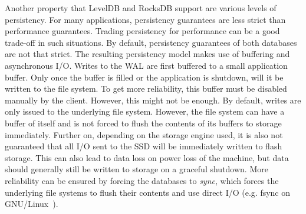 Another property that LevelDB and RocksDB support are various levels of persistency. For many applications, persistency guarantees are less strict than performance guarantees. Trading persistency for performance can be a good trade-off in such situations. By default, persistency guarantees of both databases are not that strict.  The resulting persistency model makes use of buffering and asynchronous I/O. Writes to the WAL are first buffered to a small application buffer. Only once the buffer is filled or the application is shutdown, will it be written to the file system. To get more reliability, this buffer must be disabled manually by the client. However, this might not be enough. By default, writes are only issued to the underlying file system. However, the file system can have a buffer of itself and is not forced to flush the contents of its buffers to storage immediately. Further on, depending on the storage engine used, it is also not guaranteed that all I/O sent to the SSD will be immediately written to flash storage. This can also lead to data loss on power loss of the machine, but data should generally still be written to storage on a graceful shutdown. More reliability can be ensured by forcing the databases to \textit{sync}, which forces the underlying file systems to flush their contents and use direct I/O (e.g. fsync on GNU/Linux~\cite{bornholt2016specifying}).

